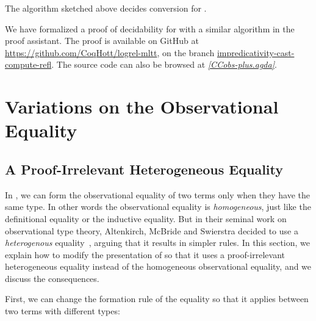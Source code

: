 \begin{theorem}
  The algorithm sketched above decides conversion for \SetoidCCplus.
\end{theorem}

We have formalized a proof of decidability for \SetoidCCplus with a similar
algorithm in the \Agda proof assistant. The proof is available on GitHub at
\url{https://github.com/CoqHott/logrel-mltt}, on the branch
\url{impredicativity-cast-compute-refl}. The source code can also be browsed
at {\small{\href{https://htmlpreview.github.io/?https://raw.githubusercontent.com/CoqHott/logrel-mltt/impredicativity-cast-compute-refl/html/Everything.html}{\emph{[CCobs-plus.agda]}}}}.

\section{Variations on the Observational Equality}
\label{sec:heterogeneous}

\subsection{A Proof-Irrelevant Heterogeneous Equality}

In \SetoidCC, we can form the observational 
equality of two terms only when they have the same type. 
% 
In other words the observational equality is \emph{homogeneous}, just like the 
definitional equality or the inductive equality.
% 
But in their seminal work on observational type theory, Altenkirch, McBride and 
Swierstra decided to use a \emph{heterogenous} 
equality~, arguing that it results in simpler
rules.
%  
In this section, we explain how to modify the presentation of \SetoidCC so that 
it uses a proof-irrelevant heterogeneous equality instead of the homogeneous 
observational equality, and we discuss the consequences.

% 
First, we can change the formation rule of the equality so that it applies 
between two terms with different types:
% 

